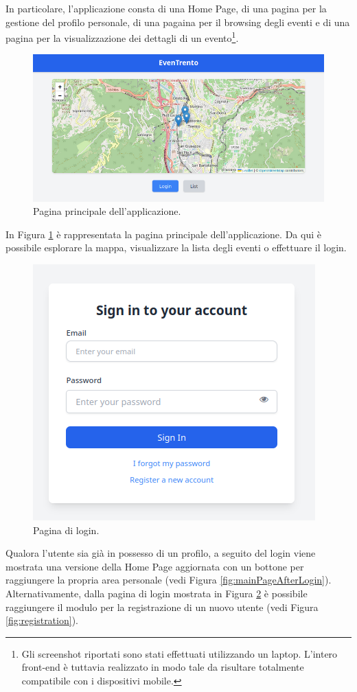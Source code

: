 \documentclass[9pt]{extarticle}
\begin{document}
In particolare, l'applicazione consta di una Home Page, di una pagina per la gestione del profilo personale, di una pagaina per il browsing degli eventi e di una pagina per la visualizzazione dei dettagli di un evento\footnote{Gli screenshot riportati sono stati effettuati utilizzando un laptop. L'intero front-end è tuttavia realizzato in modo tale da risultare totalmente compatibile con i dispositivi mobile.}.

\begin{figure}[!htb]
	\centering
	\includegraphics[width=0.8\linewidth]{./images/Index.png}
	\caption{Pagina principale dell'applicazione.}
	\label{fig:index}
\end{figure}
\newpage

In Figura \ref{fig:index} è rappresentata la pagina principale dell'applicazione. Da qui è possibile esplorare la mappa, visualizzare la lista degli eventi o effettuare il login.

\begin{figure}[!htb]
	\centering
	\includegraphics[width=0.5\linewidth]{./images/Login.png}
	\caption{Pagina di login.}
		\label{fig:login}
\end{figure}

Qualora l'utente sia già in possesso di un profilo, a seguito del login viene mostrata una versione della Home Page aggiornata con un bottone per raggiungere la propria area personale (vedi Figura \ref{fig:mainPageAfterLogin}). Alternativamente, dalla pagina di login mostrata in Figura \ref{fig:login} è possibile raggiungere il modulo per la registrazione di un nuovo utente (vedi Figura \ref{fig:registration}).
\end{document}
